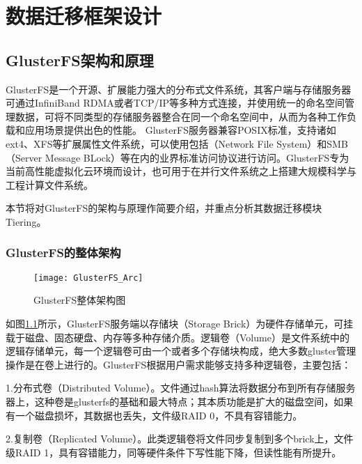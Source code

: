 \chapter{数据迁移框架设计}
\section{GlusterFS架构和原理}
GlusterFS\cite{GlusterFS}是一个开源、扩展能力强大的分布式文件系统，其客户端与存储服务器可通过InfiniBand RDMA或者TCP/IP等多种方式连接，并使用统一的命名空间管理数据，可将不同类型的存储服务器整合在同一个命名空间中，从而为各种工作负载和应用场景提供出色的性能。 GlusterFS服务器兼容POSIX标准，支持诸如ext4、XFS等扩展属性文件系统，可以使用包括（Network File System）和SMB（Server Message BLock）等在内的业界标准访问协议进行访问。GlusterFS专为当前高性能虚拟化云环境而设计，也可用于在并行文件系统之上搭建大规模科学与工程计算文件系统。 

本节将对GlusterFS的架构与原理作简要介绍，并重点分析其数据迁移模块Tiering。
\subsection{GlusterFS的整体架构}
\begin{figure}[htp]
\centering
\texttt{[image: GlusterFS\_Arc]}
\caption{GlusterFS整体架构图}
\label{fig:GlusterFS_Arc}
\end{figure}
如图\ref{fig:GlusterFS_Arc}所示，GlusterFS服务端以存储块（Storage Brick）为硬件存储单元，可挂载于磁盘、固态硬盘、内存等多种存储介质。逻辑卷（Volume）是文件系统中的逻辑存储单元，每一个逻辑卷可由一个或者多个存储块构成，绝大多数gluster管理操作是在卷上进行的。GlusterFS根据用户需求能够支持多种逻辑卷，主要包括：

1.分布式卷（Distributed Volume）。文件通过hash算法将数据分布到所有存储服务器上，这种卷是glusterfs的基础和最大特点；其本质功能是扩大的磁盘空间，如果有一个磁盘损坏，其数据也丢失，文件级RAID 0，不具有容错能力。

2.复制卷（Replicated Volume）。此类逻辑卷将文件同步复制到多个brick上，文件级RAID 1，具有容错能力，同等硬件条件下写性能下降，但读性能有所提升。

